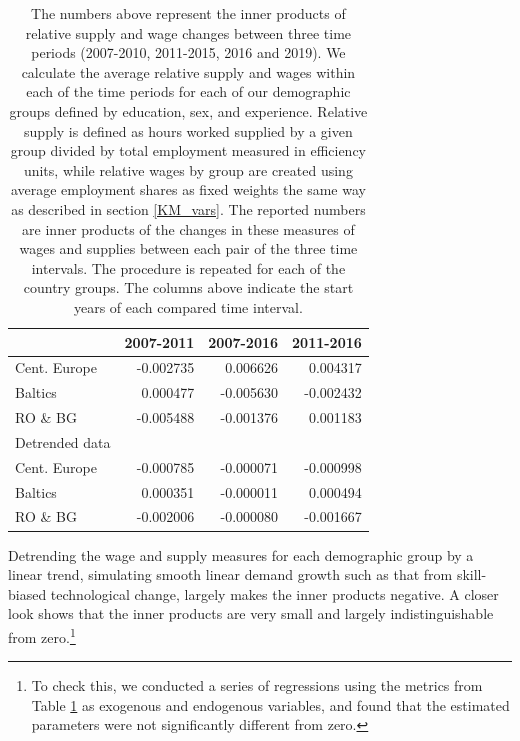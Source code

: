 \documentclass[11pt]{article}
\begin{document}
\begin{table}[!htbp]
\centering 
\caption{Inner Products of changes in relative supplies with changes in relative wages}
\label{inner_products_ls_w}
\begin{center}

\begin{tabular}{lrrr}
\toprule
{} &  2007-2011 &  2007-2016 &  2011-2016 \\
\midrule

Cent. Europe &  -0.002735 &   0.006626 &   0.004317 \\
Baltics   &   0.000477 &  -0.005630 &  -0.002432 \\
RO \& BG   &  -0.005488 &  -0.001376 &   0.001183 \\
\midrule
Detrended data\\
\midrule
Cent. Europe &  -0.000785 &  -0.000071 &  -0.000998 \\
Baltics   &   0.000351 &  -0.000011 &   0.000494 \\
RO \& BG   &  -0.002006 &  -0.000080 &  -0.001667 \\
\bottomrule
\end{tabular}
\caption*{\footnotesize  The numbers above represent the inner products of relative supply and wage changes between three time periods (2007-2010, 2011-2015, 2016 and 2019). We calculate the average relative supply and wages within each of the time periods for each of our demographic groups defined by education, sex, and experience. Relative supply is defined as hours worked supplied by a given group divided by total employment measured in efficiency units, while relative wages by group are created using average employment shares as fixed weights the same way as described in section \ref{KM_vars}. The reported numbers are inner products of the changes in these measures of wages and supplies between each pair of the three time intervals. The procedure is repeated for each of the country groups. The columns above indicate the start years of each compared time interval.}
\end{center}
\end{table}

Detrending the wage and supply measures for each demographic group by a linear trend, simulating smooth linear demand growth such as that from skill-biased technological change, largely makes the inner products negative. A closer look shows that the inner products are very small and largely indistinguishable from zero.\footnote{To check this, we conducted a series of regressions using the metrics from Table \ref{inner_products_ls_w} as exogenous and endogenous variables, and found that the estimated parameters were not significantly different from zero.}
\end{document}
